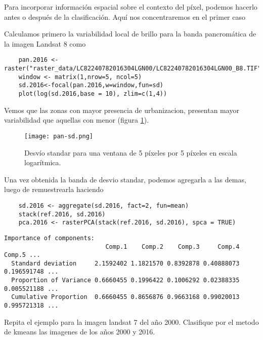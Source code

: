 \begin{exa}
  Para incorporar informaci\'on espacial sobre el contexto del p\'ixel, podemos
  hacerlo antes o despu\'es de la clasificaci\'on. Aqu\'i nos concentraremos en el primer caso

  Calculamos primero la variabilidad local de brillo para la banda pancrom\'atica de la imagen Landsat 8 como

  \begin{lstlisting}
    pan.2016 <- raster("raster_data/LC82240782016304LGN00/LC82240782016304LGN00_B8.TIF")
    window <- matrix(1,nrow=5, ncol=5)
    sd.2016<-focal(pan.2016,w=window,fun=sd)
    plot(log(sd.2016,base = 10), zlim=c(1,4))
  \end{lstlisting}

  Vemos que las zonas con mayor presencia de urbanizacion, presentan mayor variabilidad que aquellas con menor (figura \ref{fig:pansd}).

  \begin{figure}[h!]
    \centering
    \texttt{[image: pan-sd.png]}
    \caption{Desv\'io standar para una ventana de 5 p\'ixeles por 5 p\'ixeles en escala logar\'itmica.}
    \label{fig:pansd}
  \end{figure}

  Una vez obtenida la banda de desvio standar, podemos agregarla a las demas, luego de remuestrearla haciendo

  \begin{lstlisting}
    sd.2016 <- aggregate(sd.2016, fact=2, fun=mean)
    stack(ref.2016, sd.2016)
    pca.2016 <- rasterPCA(stack(ref.2016, sd.2016), spca = TRUE)
  \end{lstlisting}

  \begin{Verbatim}[fontsize=\small]
  Importance of components:
                            Comp.1    Comp.2    Comp.3     Comp.4      Comp.5 ...
  Standard deviation     2.1592402 1.1821570 0.8392878 0.40888073 0.196591748 ...
  Proportion of Variance 0.6660455 0.1996422 0.1006292 0.02388335 0.005521188 ...
  Cumulative Proportion  0.6660455 0.8656876 0.9663168 0.99020013 0.995721318 ...
  \end{Verbatim}

\end{exa}

\begin{act}
  Repita el ejemplo para la imagen landsat 7 del año 2000. Clasifique por el metodo de kmeans las imagenes de los años 2000 y 2016.
\end{act}

